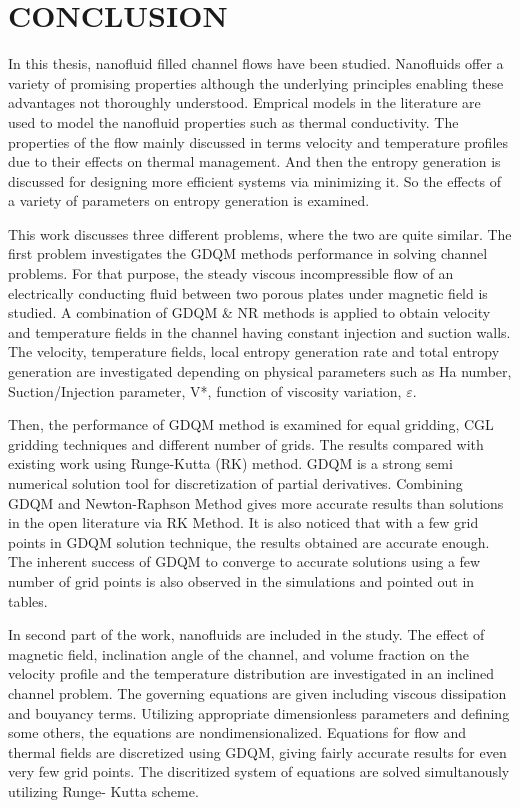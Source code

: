 \chapter{CONCLUSION}\label{ch:ifnecch5}

In this thesis, nanofluid filled channel flows have been studied. Nanofluids offer a variety of promising properties although the underlying principles enabling these advantages not thoroughly understood. Emprical models in the literature are used to model the nanofluid properties such as thermal conductivity. The properties of the flow mainly discussed in terms velocity and temperature profiles due to their effects on thermal management. And then the entropy generation is discussed for designing more efficient systems via minimizing it. So the effects of a variety of parameters on entropy generation is examined. 

This work discusses three different problems, where the two are quite similar. The first problem investigates the GDQM methods performance in solving channel problems. For that purpose, the steady viscous incompressible flow of an electrically conducting fluid between two porous plates under magnetic field is studied. A combination of GDQM \& NR methods is applied to obtain velocity and temperature fields in the channel having constant injection and suction walls. The velocity, temperature fields, local entropy generation rate and total entropy generation are investigated depending on physical parameters such as Ha number, Suction/Injection parameter, V*, function of viscosity variation, $\varepsilon $.

Then, the performance of GDQM method is examined for equal gridding, CGL gridding techniques and different number of grids. The results compared with existing work using Runge-Kutta (RK) method. GDQM is a strong semi numerical solution tool for discretization of partial derivatives. Combining GDQM and Newton-Raphson Method gives more accurate results than solutions in the open literature via RK Method. It is also noticed that with a few grid points in GDQM solution technique, the results obtained are accurate enough. The inherent success of GDQM to converge to accurate solutions using a few number of grid points is also observed in the simulations and pointed out in tables. 

In second part of the work, nanofluids are included in the study. The effect of magnetic field, inclination angle of the channel, and volume fraction on the velocity profile and the temperature distribution are investigated in an inclined channel problem. The governing equations are given including viscous dissipation and bouyancy terms. Utilizing appropriate dimensionless parameters and defining some others, the equations are nondimensionalized.  Equations for flow and thermal fields are discretized using GDQM, giving fairly accurate results for even very few grid points. The discritized system of equations are solved simultanously utilizing Runge- Kutta scheme. 

